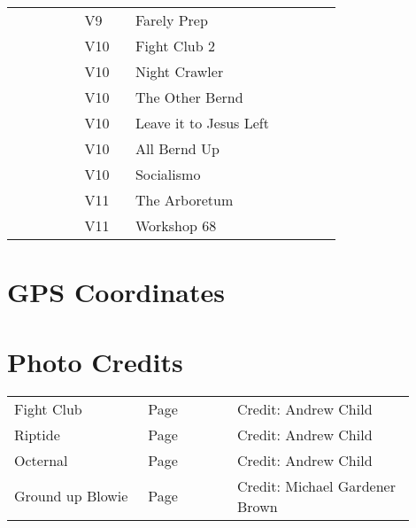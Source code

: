 \begin{flushleft}
\begin{center}
\begin{supertabular}{p{0.18\linewidth}p{0.13\linewidth}p{0.45\linewidth}p{0.08\linewidth}}
&V9&Farely Prep & \pageref{rt:Farely Prep} \\
  &V10&Fight Club 2 & \pageref{rt:Fight Club 2} \\
  &V10&Night Crawler & \pageref{rt:Night Crawler} \\
&V10&The Other Bernd & \pageref{rt:The Other Bernd} \\
&V10&Leave it to Jesus Left & \pageref{vr:Leave it to Jesus Left} \\
&V10&All Bernd Up & \pageref{rt:All Bernd Up} \\
&V10&Socialismo & \pageref{rt:Socialismo} \\
   &V11&The Arboretum & \pageref{rt:The Arboretum} \\
&V11&Workshop 68 & \pageref{rt:Workshop 68} \\
\end{supertabular}
\end{center}
\section{GPS Coordinates}
\section{Photo Credits}
\begin{supertabular}{p{0.3\linewidth}p{0.2\linewidth}p{0.4\linewidth}}
Fight Club&Page \pageref{pt:Fight Club}&Credit: Andrew Child\\
Riptide&Page \pageref{pt:Riptide}&Credit: Andrew Child\\
Octernal&Page \pageref{pt:Octernal}&Credit: Andrew Child\\
Ground up Blowie&Page \pageref{pt:Ground up Blowie}&Credit: Michael Gardener Brown\\
\end{supertabular}
\end{flushleft}
\onecolumn
\clearpage